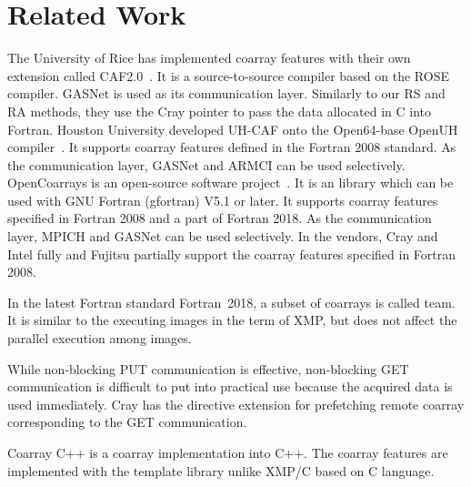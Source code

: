 \section{Related Work}\label{sec:related}

The University of Rice has implemented coarray features with their own extension 
called CAF2.0~\cite{Rice}.
It is a source-to-source compiler based on the ROSE compiler. GASNet is used as its 
communication layer.
Similarly to our RS and RA methods, they use the Cray pointer to pass the data 
allocated in C into Fortran.
%
Houston University developed UH-CAF onto the Open64-base OpenUH compiler~\cite{HU}. 
It supports coarray features defined in the Fortran 2008 standard. As the communication 
layer, GASNet and ARMCI can be used selectively.
%
OpenCoarrays is an open-source software project~\cite{OpenCo}. It is an library 
which can be used with GNU Fortran (gfortran) V5.1 or later. It supports coarray features
specified in Fortran 2008 and a part of Fortran 2018.  As the communication layer,
MPICH and GASNet can be used selectively.
%
In the vendors, Cray and Intel fully and Fujitsu partially support the coarray features
specified in Fortran 2008.

In the latest Fortran standard Fortran~2018, a subset of coarrays is called team.
It is similar to the executing images in the term of XMP, but does not affect
the parallel execution among images.

While non-blocking PUT communication is effective, non-blocking GET communication
is difficult to put into practical use because the acquired data is used immediately.
Cray has the directive extension for prefetching remote coarray corresponding to 
the GET communication.

Coarray C++ is a coarray implementation into C++. The coarray features are implemented
with the template library unlike XMP/C based on C language.


